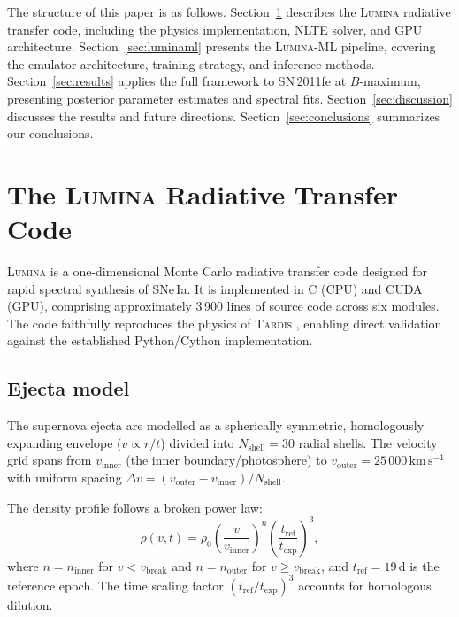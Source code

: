 \documentclass[fleqn,usenatbib]{mnras}
\newcommand{\lumina}{\textsc{Lumina}}
\newcommand{\luminaml}{\textsc{Lumina-ML}}
\newcommand{\tardis}{\textsc{Tardis}}
\newcommand{\kms}{\ensuremath{\,\mathrm{km\,s^{-1}}}}
\begin{document}
The structure of this paper is as follows. Section~\ref{sec:lumina} describes the \lumina{} radiative transfer code, including the physics implementation, NLTE solver, and GPU architecture. Section~\ref{sec:luminaml} presents the \luminaml{} pipeline, covering the emulator architecture, training strategy, and inference methods. Section~\ref{sec:results} applies the full framework to SN\,2011fe at $B$-maximum, presenting posterior parameter estimates and spectral fits. Section~\ref{sec:discussion} discusses the results and future directions. Section~\ref{sec:conclusions} summarizes our conclusions.


\section{The \lumina{} Radiative Transfer Code}
\label{sec:lumina}

\lumina{} is a one-dimensional Monte Carlo radiative transfer code designed for rapid spectral synthesis of SNe\,Ia. It is implemented in C (CPU) and CUDA (GPU), comprising approximately 3\,900 lines of source code across six modules. The code faithfully reproduces the physics of \tardis{} \citep{tardis2014}, enabling direct validation against the established Python/Cython implementation.

\subsection{Ejecta model}
\label{sec:ejecta}

The supernova ejecta are modelled as a spherically symmetric, homologously expanding envelope ($v \propto r/t$) divided into $N_\mathrm{shell} = 30$ radial shells. The velocity grid spans from $v_\mathrm{inner}$ (the inner boundary/photosphere) to $v_\mathrm{outer} = 25\,000\kms$ with uniform spacing $\Delta v = (v_\mathrm{outer} - v_\mathrm{inner})/N_\mathrm{shell}$.

The density profile follows a broken power law:
\begin{equation}
\rho(v, t) = \rho_0 \left(\frac{v}{v_\mathrm{inner}}\right)^{n} \left(\frac{t_\mathrm{ref}}{t_\mathrm{exp}}\right)^3 ,
\label{eq:density}
\end{equation}
where $n = n_\mathrm{inner}$ for $v < v_\mathrm{break}$ and $n = n_\mathrm{outer}$ for $v \geq v_\mathrm{break}$, and $t_\mathrm{ref} = 19$\,d is the reference epoch. The time scaling factor $(t_\mathrm{ref}/t_\mathrm{exp})^3$ accounts for homologous dilution.
\end{document}
